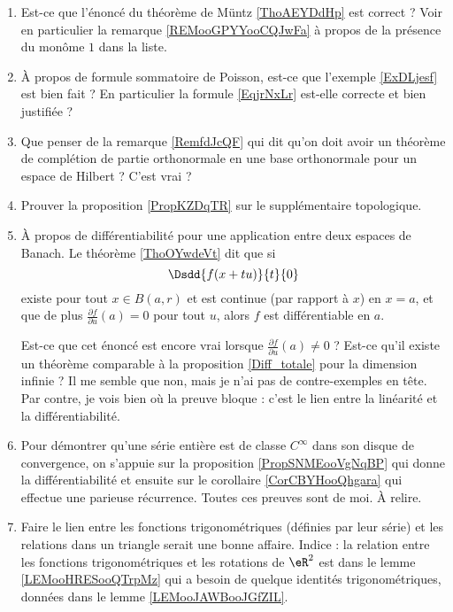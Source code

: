 \begin{enumerate}
    \item
        Est-ce que l'énoncé du théorème de Müntz \ref{ThoAEYDdHp} est correct ? Voir en particulier la remarque \ref{REMooGPYYooCQJwFa} à propos de la présence du monôme  \( 1\) dans la liste.
    \item
        À propos de formule sommatoire de Poisson, est-ce que l'exemple \ref{ExDLjesf} est bien fait ? En particulier la formule \eqref{EqjrNxLr} est-elle correcte et bien justifiée ?
    \item
        Que penser de la remarque \ref{RemfdJcQF} qui dit qu'on doit avoir un théorème de complétion de partie orthonormale en une base orthonormale pour un espace de Hilbert ? C'est vrai ?
    \item
        Prouver la proposition \ref{PropKZDqTR} sur le supplémentaire topologique.
    \item   \label{ItemLPrIWZhPg}
        À propos de différentiabilité pour une application entre deux espaces de Banach. Le théorème \ref{ThoOYwdeVt} dit que si
    \begin{equation}
        \Dsdd{ f(x+tu) }{t}{0}
    \end{equation}
    existe pour tout \( x\in B(a,r)\) et est continue (par rapport à \( x\)) en \( x=a\), et que de plus \( \frac{ \partial f }{ \partial u }(a)=0\) pour tout \( u\), alors \( f\) est différentiable en \( a\).

    Est-ce que cet énoncé est encore vrai lorsque \( \frac{ \partial f }{ \partial u }(a)\neq 0\) ? Est-ce qu'il existe un théorème comparable à la proposition \ref{Diff_totale} pour la dimension infinie ? Il me semble que non, mais je n'ai pas de contre-exemples en tête. Par contre, je vois bien où la preuve bloque : c'est le lien entre la linéarité et la différentiabilité.

    \item
        Pour démontrer qu'une série entière est de classe \(  C^{\infty}\) dans son disque de convergence, on s'appuie sur la proposition \ref{PropSNMEooVgNqBP} qui donne la différentiabilité et ensuite sur le corollaire \ref{CorCBYHooQhgara} qui effectue une parieuse récurrence. Toutes ces preuves sont de moi. À relire.

    \item

        Faire le lien entre les fonctions trigonométriques (définies par leur série) et les relations dans un triangle serait une bonne affaire. Indice : la relation entre les fonctions trigonométriques et les rotations de \( \eR^2\) est dans le lemme \ref{LEMooHRESooQTrpMz} qui a besoin de quelque identités trigonométriques, données dans le lemme \ref{LEMooJAWBooJGfZIL}.


\end{enumerate}
